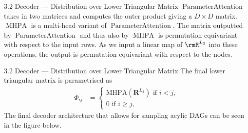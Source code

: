 \documentclass[aspectratio=169,10pt]{beamer}
\begin{document}
\begin{frame}{3.2 Decoder --- Distribution over Lower Triangular Matrix}
$\operatorname{ParameterAttention}$ takes in two matrices and computes the outer product giving a $D \times D$ matrix. $\operatorname{MHPA}$ is a multi-head variant of $\operatorname{ParameterAttention}$. The matrix outputted by $\operatorname{ParameterAttention}$ and thus also by $\operatorname{MHPA}$ is permutation equivariant with respect to the input rows. As we input a linear map of $\rmR^{L_2}$ into these operations, the output is permutation equivariant with respect to the nodes.
\end{frame}

\begin{frame}{3.2 Decoder --- Distribution over Lower Triangular Matrix}
The final lower triangular matrix is parametrised as
\begin{align*}
    \Phi_{ij}  &= \begin{cases}
         \text{MHPA}(\mathbf{R}^{L_2})  \text{ if } i < j, \\
         0 \text{ if } i \geq j,
     \end{cases}
\end{align*}
The final decoder architecture that allows for sampling acylic DAGs can be seen in the figure below.
\end{frame}
\end{document}

